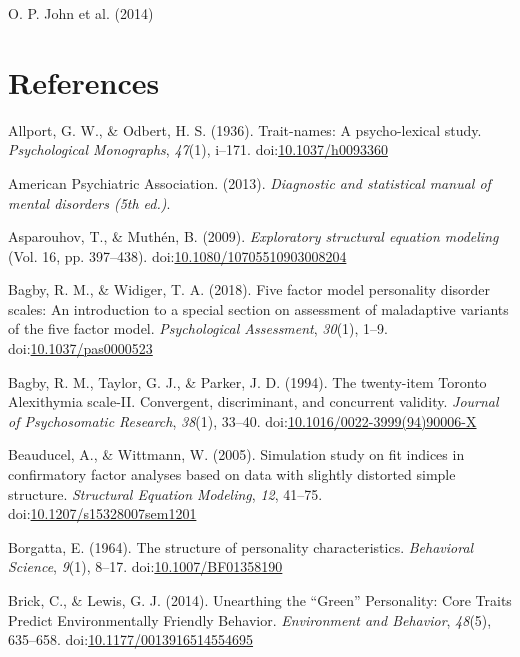 \documentclass[,man,floatsintext]{apa6}
\begin{document}
O. P. John et al. (2014)

\newpage

\section{References}\label{references}

\begingroup
\setlength{\parindent}{-0.5in} \setlength{\leftskip}{0.5in}

\hypertarget{refs}{}
\hypertarget{ref-AllportOdbert1936}{}
Allport, G. W., \& Odbert, H. S. (1936). Trait-names: A psycho-lexical
study. \emph{Psychological Monographs}, \emph{47}(1), i--171.
doi:\href{https://doi.org/10.1037/h0093360}{10.1037/h0093360}

\hypertarget{ref-APA2013}{}
American Psychiatric Association. (2013). \emph{Diagnostic and
statistical manual of mental disorders (5th ed.)}.

\hypertarget{ref-AsparouhovMuthen2009}{}
Asparouhov, T., \& Muthén, B. (2009). \emph{Exploratory structural
equation modeling} (Vol. 16, pp. 397--438).
doi:\href{https://doi.org/10.1080/10705510903008204}{10.1080/10705510903008204}

\hypertarget{ref-Bagby2018}{}
Bagby, R. M., \& Widiger, T. A. (2018). Five factor model personality
disorder scales: An introduction to a special section on assessment of
maladaptive variants of the five factor model. \emph{Psychological
Assessment}, \emph{30}(1), 1--9.
doi:\href{https://doi.org/10.1037/pas0000523}{10.1037/pas0000523}

\hypertarget{ref-Bagby1994}{}
Bagby, R. M., Taylor, G. J., \& Parker, J. D. (1994). The twenty-item
Toronto Alexithymia scale-II. Convergent, discriminant, and concurrent
validity. \emph{Journal of Psychosomatic Research}, \emph{38}(1),
33--40.
doi:\href{https://doi.org/10.1016/0022-3999(94)90006-X}{10.1016/0022-3999(94)90006-X}

\hypertarget{ref-Beauducel2005}{}
Beauducel, A., \& Wittmann, W. (2005). Simulation study on fit indices
in confirmatory factor analyses based on data with slightly distorted
simple structure. \emph{Structural Equation Modeling}, \emph{12},
41--75.
doi:\href{https://doi.org/10.1207/s15328007sem1201}{10.1207/s15328007sem1201}

\hypertarget{ref-Borgatta1964}{}
Borgatta, E. (1964). The structure of personality characteristics.
\emph{Behavioral Science}, \emph{9}(1), 8--17.
doi:\href{https://doi.org/10.1007/BF01358190}{10.1007/BF01358190}

\hypertarget{ref-Brick2014}{}
Brick, C., \& Lewis, G. J. (2014). Unearthing the ``Green'' Personality:
Core Traits Predict Environmentally Friendly Behavior. \emph{Environment
and Behavior}, \emph{48}(5), 635--658.
doi:\href{https://doi.org/10.1177/0013916514554695}{10.1177/0013916514554695}
\end{document}
